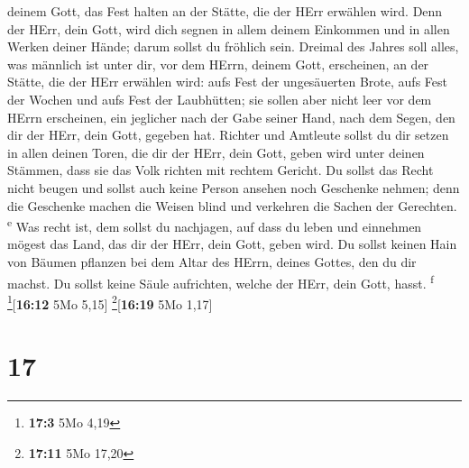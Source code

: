 deinem Gott, das Fest halten an der Stätte, die der HErr erwählen wird.
Denn der HErr, dein Gott, wird dich segnen in allem deinem Einkommen und
in allen Werken deiner Hände; darum sollst du fröhlich sein.
 Dreimal des Jahres soll alles, was männlich ist unter
dir, vor dem HErrn, deinem Gott, erscheinen, an der Stätte, die der HErr
erwählen wird: aufs Fest der ungesäuerten Brote, aufs Fest der Wochen
und aufs Fest der Laubhütten; sie sollen aber nicht leer vor dem HErrn
erscheinen,  ein jeglicher nach der Gabe seiner Hand,
nach dem Segen, den dir der HErr, dein Gott, gegeben hat.
 Richter und Amtleute sollst du dir setzen in allen
deinen Toren, die dir der HErr, dein Gott, geben wird unter deinen
Stämmen, dass sie das Volk richten mit rechtem Gericht. 
Du sollst das Recht nicht beugen und sollst auch keine Person ansehen
noch Geschenke nehmen; denn die Geschenke machen die Weisen blind und
verkehren die Sachen der Gerechten. \textsuperscript{e} 
Was recht ist, dem sollst du nachjagen, auf dass du leben und einnehmen
mögest das Land, das dir der HErr, dein Gott, geben wird.
 Du sollst keinen Hain von Bäumen pflanzen bei dem Altar
des HErrn, deines Gottes, den du dir machst.  Du sollst
keine Säule aufrichten, welche der HErr, dein Gott, hasst.
\textsuperscript{f} \footnote{\textbf{17:3} 5Mo 4,19}{[}\textbf{16:12}
5Mo 5,15{]} \footnote{\textbf{17:11} 5Mo 17,20}{[}\textbf{16:19} 5Mo
1,17{]}

\hypertarget{section-16}{%
\section{17}\label{section-16}}

